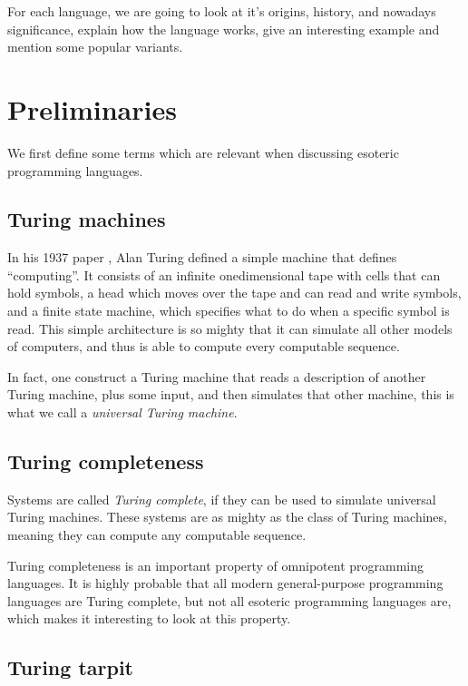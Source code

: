 \documentclass{sig-alternate}
\begin{document}
For each language, we are going to look at it's origins, history, and nowadays significance, explain how the language works, give an interesting example and mention some popular variants.

\section{Preliminaries}

We first define some terms which are relevant when discussing esoteric programming languages.

\subsection{Turing machines}

In his 1937 paper \cite{turing1937computable}, Alan Turing defined a simple machine that defines “computing”. It consists of an infinite onedimensional tape with cells that can hold symbols, a head which moves over the tape and can read and write symbols, and a finite state machine, which specifies what to do when a specific symbol is read. This simple architecture is so mighty that it can simulate all other models of computers, and thus is able to compute every computable sequence.

In fact, one construct a Turing machine that reads a description of another Turing machine, plus some input, and then simulates that other machine, this is what we call a \emph{universal Turing machine}.

\subsection{Turing completeness}

Systems are called \emph{Turing complete}, if they can be used to simulate universal Turing machines. These systems are as mighty as the class of Turing machines, meaning they can compute any computable sequence.

Turing completeness is an important property of omnipotent programming languages. It is highly probable that all modern general-purpose programming languages are Turing complete, but not all esoteric programming languages are, which makes it interesting to look at this property.

\subsection{Turing tarpit}
\end{document}
